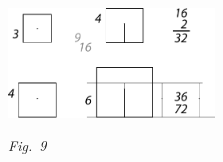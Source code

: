 %
\vspace{4.5em}
   \centerline{\includegraphics[width=0.41\textwidth]{gesamttex/edit_VIII,3/images/LH_35_14_02_046v,047v_d9.pdf}}%
  \vspace{0.5em}
  \centerline{\lbrack\textit{Fig.~9}\rbrack}%
  \label{LH_35_14_02_046v,047v_Fig.9}%
%
%
